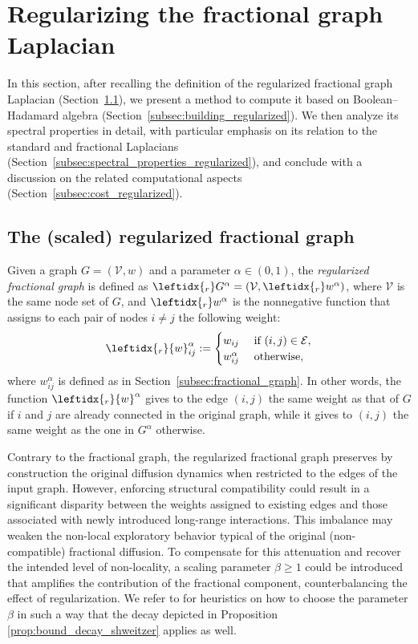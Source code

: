 \documentclass[a4paper,12pt]{article}
\newcommand{\cE}{\mathcal{E}}
\newcommand{\cV}{\mathcal{V}}
\newcommand{\fG}{G^\alpha}
\newcommand{\rfG}{\leftidx{_r}\fG}
\begin{document}
\section{Regularizing the fractional graph Laplacian} \label{sec:reg_fractional_laplacian}

In this section, after recalling the definition of the regularized fractional graph Laplacian (Section~\ref{subsec:regularized}), we present a method to compute it based on Boolean--Hadamard algebra (Section~\ref{subsec:building_regularized}). We then analyze its spectral properties in detail, with particular emphasis on its relation to the standard and fractional Laplacians (Section~\ref{subsec:spectral_properties_regularized}), and conclude with a discussion on the related computational aspects (Section~\ref{subsec:cost_regularized}).

\subsection{The (scaled) regularized fractional graph}
\label{subsec:regularized}

Given a graph $G=(\cV,w)$ and a parameter $\alpha\in(0,1)$, the \emph{regularized fractional graph} \cite{Bianchi2022} is defined as $\rfG = (\cV,\leftidx{_r}w^\alpha)$, where $\cV$ is the same node set of $G$, and $\leftidx{_r}w^\alpha$ is the nonnegative function that assigns to each pair of nodes $i\neq j$ the following weight:
\begin{equation*}
\leftidx{_r}{w}^{\alpha}_{ij}:=
\begin{cases}
    w_{ij}  & \text{ if } (i,j)\in\cE, \\
    w_{ij}^{\alpha} &  \text{ otherwise, } \\
\end{cases}
\end{equation*}
 where $w_{ij}^{\alpha}$ is defined as in Section~\ref{subsec:fractional_graph}. In other words, the function $\leftidx{_r}{w}^{\alpha}$ gives to the edge $(i,j)$ the same weight as that of $G$ if $i$ and $j$ are already connected in the original graph, while it gives to $(i,j)$ the same weight as the one in $G^\alpha$ otherwise. 


Contrary to the fractional graph, the regularized fractional graph preserves by construction the original diffusion dynamics when restricted to the edges of the input graph. However, enforcing structural compatibility could result in a significant disparity between the weights assigned to existing edges and those associated with newly introduced long-range interactions. This imbalance may weaken the non-local exploratory behavior typical of the original (non-compatible) fractional diffusion. To compensate for this attenuation and recover the intended level of non-locality, a scaling parameter 
$\beta\ge1$ could be introduced that amplifies the contribution of the fractional component, counterbalancing the effect of regularization. We refer to \cite{Bianchi2022} for heuristics on how to choose the parameter $\beta$ in such a way that the decay depicted in Proposition \ref{prop:bound_decay_shweitzer} applies as well. 
\end{document}
